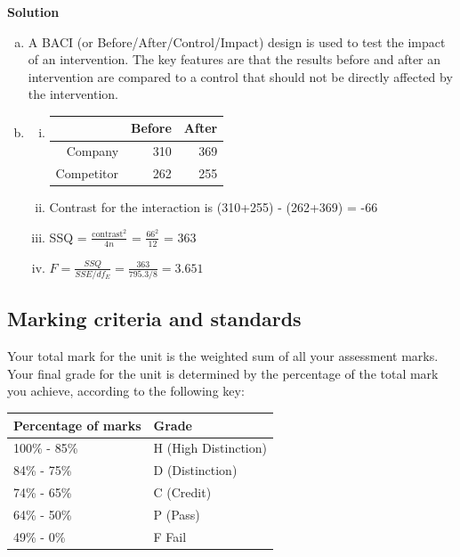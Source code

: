 \documentclass{uws_learning_guide}
\begin{document}
\textbf{Solution}
\begin{enumerate}[a)]
\item A BACI (or Before/After/Control/Impact) design is used to
  test the impact of an intervention. The key features are that the
  results before and after an intervention are compared to a control
  that should not be directly affected by the intervention.
\item \begin{enumerate}[i)]
\item \begin{tabular}{rrr}
  \toprule
 & Before & After \\ 
  \midrule
Company & 310 & 369 \\ 
  Competitor & 262 & 255 \\ 
   \bottomrule
\end{tabular}
\item Contrast for the interaction is (310+255) - (262+369) = -66
\item SSQ = $\frac{\text{contrast}^2}{4n}$ = $\frac{66^2}{12}$ = 363
\item $F = \frac{SSQ}{SSE/df_E} = \frac{363}{795.3/8} = 3.651$
\end{enumerate}
\end{enumerate}






















\subsection{Marking criteria and standards}

Your total mark for the unit is the weighted sum of all your
assessment marks.  Your final grade for the unit is determined by the
percentage of the total mark you achieve, according to the following
key:

\begin{center}
  \begin{tabularx}{0.5\textwidth}{XX}
    \toprule
    Percentage of marks & Grade \\
    \midrule
    100\% - 85\% & H (High Distinction) \\
    84\% - 75\% & D (Distinction) \\
    74\% - 65\% & C (Credit) \\
    64\% - 50\% & P (Pass) \\
    49\% - 0\% & F Fail \\
    \bottomrule
  \end{tabularx}
\end{center}
\end{document}
